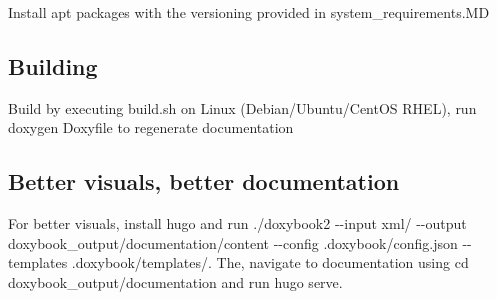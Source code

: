 Install apt packages with the versioning provided in {\ttfamily system\+\_\+requirements.\+MD}

\subsection*{Building}

Build by executing build.\+sh on Linux (Debian/\+Ubuntu/\+Cent\+OS R\+H\+EL), run {\ttfamily doxygen Doxyfile} to regenerate documentation

\subsection*{Better visuals, better documentation}

For better visuals, install {\ttfamily hugo} and run {\ttfamily ./doxybook2 -\/-\/input xml/ -\/-\/output doxybook\+\_\+output/documentation/content -\/-\/config .doxybook/config.\+json -\/-\/templates .doxybook/templates/}. The, navigate to documentation using {\ttfamily cd doxybook\+\_\+output/documentation} and run {\ttfamily hugo serve}. 